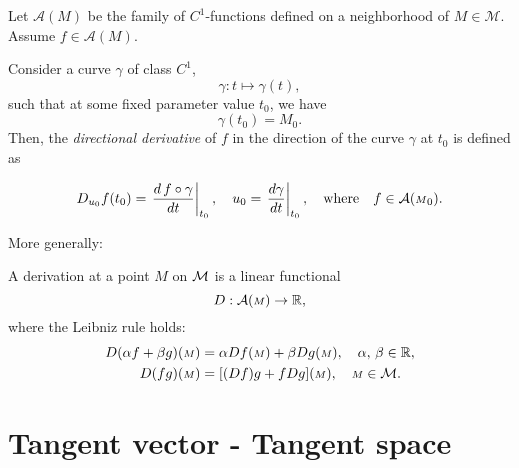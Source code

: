 \begin{definition}\label{D:dirder}

Let \( \mathcal{A}({\scriptstyle M}) \) be the family of \( C^1 \)-functions defined on a neighborhood of \( {\scriptstyle M} \in \mathcal{M} \). Assume \( f \in \mathcal{A}({\scriptstyle M}) \).  

Consider a curve \( \gamma \) of class \( C^1 \),  
\[
\gamma: t \mapsto \gamma(t),
\]
such that at some fixed parameter value \( t_0 \), we have  
\[
\gamma(t_0) = {\scriptstyle M}_0.
\]  
Then, the \emph{directional derivative} of \( f \) in the direction of the curve \( \gamma \) at \( t_0 \) is defined as  


\begin{equation}\label{E:dirder}
D_{u_{0}}f(t_{0})=\left. \frac{d\,f\circ \gamma}{dt}\right|_{t_0}, \quad u_{0}=\left.\frac{d\gamma}{dt}\right|_{t_{0}},\quad \text{where}\quad f  \in \mathcal{A}({\scriptstyle M}_0).
\end{equation}
 \end{definition}
 
 More  generally:
\begin{definition}[Derivation]
A derivation at a point ${\scriptstyle M}$ on $\mathcal{M}$ is a linear functional \[D:\mathcal{A}({\scriptstyle M}) \to \mathbb{R},\] where the Leibniz rule holds:
\begin{align}\label{E:Leibniz}\index{Derivative!Leibniz rule}
D(\alpha f + \beta g)({\scriptstyle M})&=\alpha Df ({\scriptstyle M})+ \beta Dg({\scriptstyle M}), \quad \alpha,\, \beta \in \bbR,\\
D(fg)({\scriptstyle M})&= [(Df)g +fDg]({\scriptstyle M}), \quad {\scriptstyle M}\in \cM.
\end{align} 
\end{definition}



\section{Tangent vector - Tangent space}
\ 

